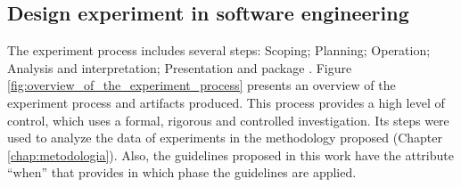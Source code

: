 \subsection{Design experiment in software engineering}
\label{subsec:background-design-experiment-software-engineering}
The experiment process includes several steps: Scoping; Planning; Operation; Analysis and interpretation; Presentation and package \cite{Wohlin2000}. Figure \ref{fig:overview_of_the_experiment_process} presents an overview of the experiment process and artifacts produced. This process provides a high level of control, which uses a formal, rigorous and controlled investigation. Its steps were used to analyze the data of experiments in the methodology proposed (Chapter \ref{chap:metodologia}). Also, the guidelines proposed in this work have the attribute ``when'' that provides in which phase the guidelines are applied.

 	\begin{figure}[h] 
   	    \captionsetup{width=16cm}%
	\end{figure}

